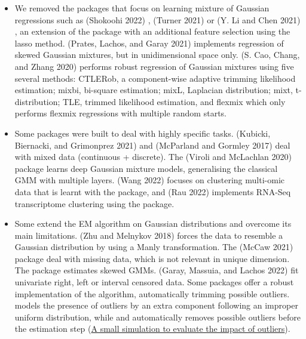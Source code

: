 \begin{itemize}
\item
  We removed the packages that focus on learning mixture of Gaussian
  regressions such as  (Shokoohi 2022) , 
  (Turner 2021) or  (Y. Li and Chen 2021) , an extension of
  the  package with an additional feature selection
  using the lasso method.  (Prates, Lachos, and Garay 2021) implements
  regression of skewed Gaussian mixtures, but in unidimensional space
  only.  (S. Cao, Chang, and Zhang 2020) performs robust regression
  of Gaussian mixtures using five several methods: CTLERob, a
  component-wise adaptive trimming likelihood estimation; mixbi,
  bi-square estimation; mixL, Laplacian distribution; mixt,
  t-distribution; TLE, trimmed likelihood estimation, and flexmix
  which only performs flexmix regressions with multiple random starts.
\item
  Some packages were built to deal with highly specific tasks.
   (Kubicki, Biernacki, and Grimonprez 2021) and 
  (McParland and Gormley 2017) deal with mixed data (continuous + discrete). The
   (Viroli and McLachlan 2020) package learns deep Gaussian mixture
  models, generalising the classical GMM with multiple layers.
   (Wang 2022) focuses on clustering multi-omic data that
  is learnt with the  package, and 
  (Rau 2022) implements RNA-Seq transcriptome clustering using the
   package.
\item
  Some extend the EM algorithm on Gaussian distributions and overcome
  its main limitations.  (Zhu and Melnykov 2018) forces the
  data to resemble a Gaussian distribution by using a Manly
  transformation. The  (McCaw 2021) package deal with
  missing data, which is not relevant in unique dimension. The
   package estimates skewed GMMs. 
  (Garay, Massuia, and Lachos 2022) fit univariate right, left or interval censored
  data. Some packages offer a robust implementation of the algorithm,
  automatically trimming possible outliers.  models the
  presence of outliers by an extra component following an improper
  uniform distribution, while  and 
  automatically removes possible outliers before the estimation step
  (\protect\hyperlink{a-small-simulation-to-evaluate-the-impact-of-outliers}{A small simulation to evaluate the impact of outliers}).

\end{itemize}

